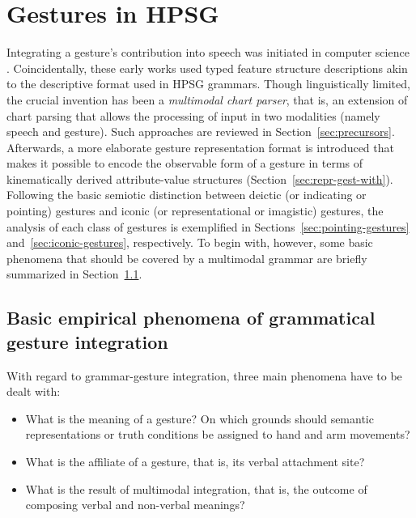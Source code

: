 \documentclass[output=paper,biblatex,babelshorthands,newtxmath,draftmode,colorlinks,citecolor=brown]{langscibook}
\begin{document}
\section{Gestures in HPSG}
\label{sec:gestures-hpsg}

Integrating a gesture's contribution into speech was initiated in computer science \citep{Bolt:1980}.
%
Coincidentally, these early works used typed feature structure descriptions akin to the descriptive format used in HPSG grammars.
%
Though linguistically limited, the crucial invention has been a \emph{multimodal chart parser}, that is, an extension of chart parsing that allows the processing of input in two modalities (namely speech and gesture).
%
Such approaches are reviewed in Section~\ref{sec:precursors}.
%
Afterwards, a more elaborate gesture representation format is introduced that makes it possible to encode the observable form of a gesture in terms of kinematically derived attribute-value structures (Section~\ref{sec:repr-gest-with}).
%
Following the basic semiotic distinction between deictic (or indicating or pointing) gestures and iconic (or representational or imagistic) gestures, the analysis of each class of gestures is exemplified in Sections~\ref{sec:pointing-gestures} and~\ref{sec:iconic-gestures}, respectively.
%
To begin with, however, some basic phenomena that should be covered by a multimodal grammar are briefly summarized in Section~\ref{sec:empir-desid-gramm}.



\subsection{Basic empirical phenomena of grammatical gesture integration}
\label{sec:empir-desid-gramm}

With regard to grammar-gesture integration, three main phenomena have to be dealt with:
%
\begin{itemize}
\item What is the meaning of a gesture? On which grounds should semantic representations or truth conditions be assigned to hand and arm movements?
\item What is the affiliate of a gesture, that is, its verbal attachment site?
\item What is the result of multimodal integration, that is, the outcome of composing verbal and non-verbal meanings?
\end{itemize}
\end{document}
